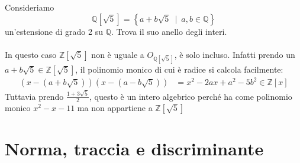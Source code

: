 \begin{esempio}
	Consideriamo
	\begin{equation*}
	\mathbb{Q}[\sqrt{5}]=\left\{a+b\sqrt{5} \ \mid \ a,b\in\mathbb{Q}\right\}
	\end{equation*}
	un'estensione di grado 2 su $\mathbb{Q}$. Trova il suo anello degli interi. \\ \\
	In questo caso $\mathbb{Z}[\sqrt{5}]$ non è uguale a $O_{\mathbb{Q}[\sqrt{5}]}$, è solo incluso. Infatti prendo un $a+b\sqrt{5}\in\mathbb{Z}[\sqrt{5}]$, il polinomio monico di cui è radice si calcola facilmente:
	\begin{align*}
	\left(x-(a+b\sqrt{5})\right)\left(x-(a-b\sqrt{5})\right)&=x^2-2ax+a^2-5b^2\in\mathbb{Z}[x]
	\end{align*}
	Tuttavia prendo $\frac{1+3\sqrt{5}}{2}$, questo è un intero algebrico perché ha come polinomio monico $x^2-x-11$ ma non appartiene a $\mathbb{Z}[\sqrt{5}]$
\end{esempio}




\section{Norma, traccia e discriminante}
\label{lezione18}
